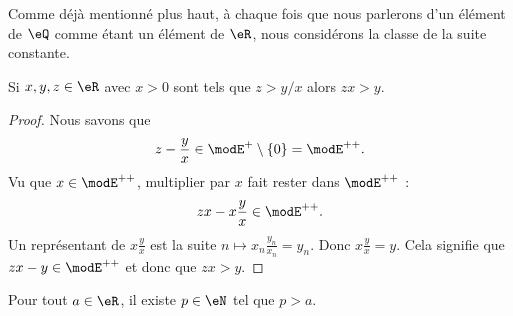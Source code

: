 \begin{remark}
    Comme déjà mentionné plus haut, à chaque fois que nous parlerons d'un élément de \( \eQ\) comme étant un élément de \( \eR\), nous considérons la classe de la suite constante.
\end{remark}

\begin{lemma}       \label{LemooYNOVooOwoRwD}
    Si \( x,y,z\in \eR\) avec \( x>0\) sont tels que \( z>y/x\) alors \( zx>y\).
\end{lemma}

\begin{proof}
    Nous savons que
    \begin{equation}
        z-\frac{ y }{ x }\in \modE^+\setminus\{ 0 \}=\modE^{++}.
    \end{equation}
    Vu que \( x\in\modE^{++}\), multiplier par \( x\) fait rester dans \( \modE^{++}\) :
    \begin{equation}
        zx-x\frac{ y }{ x }\in \modE^{++}.
    \end{equation}
    Un représentant de \( x\frac{ y }{ x }\) est la suite \( n\mapsto x_n\frac{ y_n }{ x_n }=y_n\). Donc \( x\frac{ y }{ x }=y\). Cela signifie que \( zx-y\in\modE^{++}\) et donc que \( zx>y\).
\end{proof}

\begin{lemma}       \label{LemooMWOUooVWgaEi}
    Pour tout \( a\in \eR\), il existe \( p\in \eN\) tel que \( p>a\).
\end{lemma}

